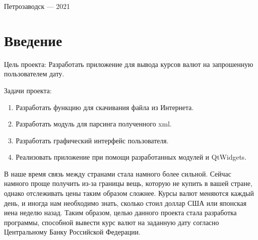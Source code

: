 \documentclass[a4paper,12pt]{article}
\begin{document}
\vfill

\begin{center}
\large
    Петрозаводск --- 2021
\end{center}



\newpage

\tableofcontents





\newpage
\section*{Введение}

Цель проекта: Разработать приложение для вывода курсов валют на запрошенную пользователем дату.

Задачи проекта: 
\begin{enumerate} 
    \item Разработать функцию для скачивания файла из Интернета.
    \item Разработать модуль для парсинга полученного xml.
    \item Разработать графический интерфейс пользователя.
    \item Реализовать приложение при помощи разработанных модулей и QtWidgets.
\end{enumerate}

В наше время связь между странами стала намного более сильной. Сейчас намного проще получить из-за границы вещь, которую не купить в вашей стране, однако отслеживать цены таким образом сложнее. Курсы валют меняются каждый день, и иногда нам необходимо знать, сколько стоил доллар США или японская иена неделю назад. Таким образом, целью данного проекта стала разработка программы, способной вывести курс валют на заданную дату согласно Центральному Банку Российской Федерации.
\end{document}
